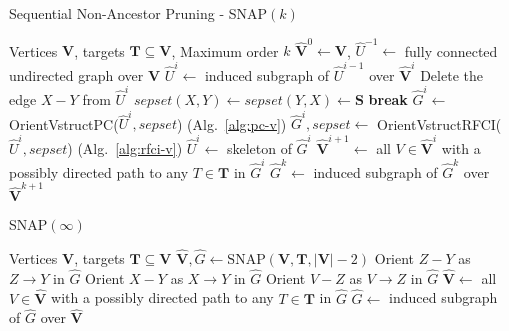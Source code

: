 \begin{algorithm*}
\caption{Sequential Non-Ancestor Pruning - SNAP$(k)$}
\label{alg:snap(k)}
\footnotesize{
\begin{algorithmic}[1]
    \Require Vertices $\mathbf{V}$, targets $\mathbf{T} \subseteq \mathbf{V}$, Maximum order $k$
    \State $\hat{\mathbf{V}}^{0} \gets \mathbf{V}$, $\hat{U}^{-1} \gets$ fully connected undirected graph over $\mathbf{V}$
        \State $\hat{U}^i \gets$ induced subgraph of $\hat{U}^{i-1}$ over $\hat{\mathbf{V}}^{i}$
         
                            \State Delete the edge $X - Y$ from ${\hat{U}^i}$
                            \State $sepset(X,Y) \gets sepset(Y,X) \gets \mathbf{S}$
                            \State \textbf{break}
                        \EndIf
                \EndFor
        \EndFor
         
            \State$\hat{G}^i \gets$ OrientVstructPC($\hat{U}^i, sepset$) (Alg.~\ref{alg:pc-v})
        \Else
            \State$\hat{G}^i, sepset \gets$ OrientVstructRFCI($\hat{U}^i, sepset$) (Alg.~\ref{alg:rfci-v})
            \State $\hat{U}^i \gets$ skeleton of $\hat{G}^i$
        \EndIf
        \State $\hat{\mathbf{V}}^{i+1} \gets$ all $V \in \hat{\mathbf{V}}^{i}$ with a possibly directed path to any $T \in \mathbf{T}$ in $\hat{G}^i$ 
    \EndFor
\State $\hat{G}^k \gets$ induced subgraph of $\hat{G}^k$ over $\hat{\mathbf{V}}^{k+1}$    \State{}
\end{algorithmic}
}
\end{algorithm*}

\begin{algorithm}
\caption{SNAP$(\infty)$ }
\footnotesize{
\label{alg:snap(inf)}
\begin{algorithmic}[1]
    \Require Vertices $\mathbf{V}$, targets $\mathbf{T} \subseteq \mathbf{V}$
    \State $\hat{\mathbf{V}}, \hat{G} \gets \text{SNAP}(\mathbf{V}, \mathbf{T}, |\mathbf{V}|-2)$
    \Repeat {}
            \State Orient $Z - Y$ as $Z \to Y$ in $\hat{G}$
        \EndIf
            \State Orient $X - Y$ as $X \to Y$ in $\hat{G}$
        \EndIf
            \State Orient $V - Z$ as $V \to Z$ in $\hat{G}$
        \EndIf
    \State $\hat{\mathbf{V}} \gets$ all $V \in \hat{\mathbf{V}}$ with a possibly directed path to any $T \in \mathbf{T}$ in $\hat{G}$
    \State $\hat{G} \gets$ induced subgraph of $\hat{G}$ over $\hat{\mathbf{V}}$
    \State{}
\end{algorithmic}
}
\end{algorithm}

